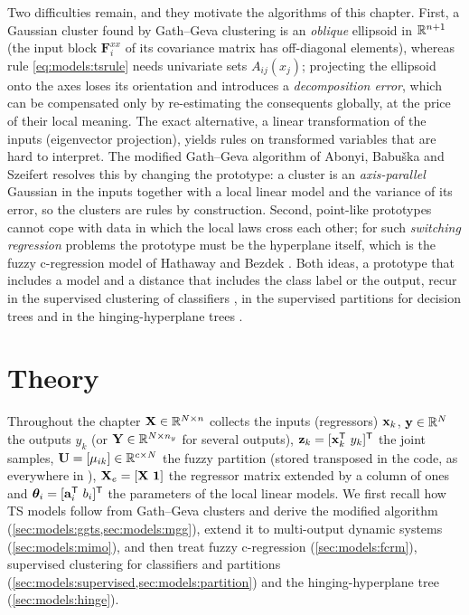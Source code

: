 Two difficulties remain, and they motivate the algorithms of this chapter. First, a Gaussian cluster found by Gath--Geva clustering is an \emph{oblique} ellipsoid in $\mathbb{R}^{n+1}$ (the input block $\mathbf{F}^{xx}_i$ of its covariance matrix has off-diagonal elements), whereas rule \eqref{eq:models:tsrule} needs univariate sets $A_{ij}(x_j)$; projecting the ellipsoid onto the axes loses its orientation and introduces a \emph{decomposition error}, which can be compensated only by re-estimating the consequents globally, at the price of their local meaning. The exact alternative, a linear transformation of the inputs (eigenvector projection), yields rules on transformed variables that are hard to interpret. The modified Gath--Geva algorithm of Abonyi, Babu\v{s}ka and Szeifert \cite{abonyi:2002:mgg} resolves this by changing the prototype: a cluster is an \emph{axis-parallel} Gaussian in the inputs together with a local linear model and the variance of its error, so the clusters are rules by construction. Second, point-like prototypes cannot cope with data in which the local laws cross each other; for such \emph{switching regression} problems the prototype must be the hyperplane itself, which is the fuzzy c-regression model of Hathaway and Bezdek \cite{hathaway:1993:fcrm}. Both ideas, a prototype that includes a model and a distance that includes the class label or the output, recur in the supervised clustering of classifiers \cite{abonyi:2003:supervised}, in the supervised partitions for decision trees \cite{abonyi:2010:partition} and in the hinging-hyperplane trees \cite{kenesei:2013:hinge}.

\section{Theory}\label{sec:models:theory}

Throughout the chapter $\mathbf{X}\in\mathbb{R}^{N\times n}$ collects the inputs (regressors) $\mathbf{x}_k$, $\mathbf{y}\in\mathbb{R}^N$ the outputs $y_k$ (or $\mathbf{Y}\in\mathbb{R}^{N\times n_y}$ for several outputs), $\mathbf{z}_k=[\xk\T\ y_k]\T$ the joint samples, $\mathbf{U}=[\mu_{ik}]\in\mathbb{R}^{c\times N}$ the fuzzy partition (stored transposed in the code, as everywhere in ), $\mathbf{X}_e=[\mathbf{X}\ \mathbf{1}]$ the regressor matrix extended by a column of ones and $\boldsymbol\theta_i=[\mathbf{a}_i^{\mathsf{T}}\ b_i]^{\mathsf{T}}$ the parameters of the local linear models. We first recall how TS models follow from Gath--Geva clusters and derive the modified algorithm (\cref{sec:models:ggts,sec:models:mgg}), extend it to multi-output dynamic systems (\cref{sec:models:mimo}), and then treat fuzzy c-regression (\cref{sec:models:fcrm}), supervised clustering for classifiers and partitions (\cref{sec:models:supervised,sec:models:partition}) and the hinging-hyperplane tree (\cref{sec:models:hinge}).

